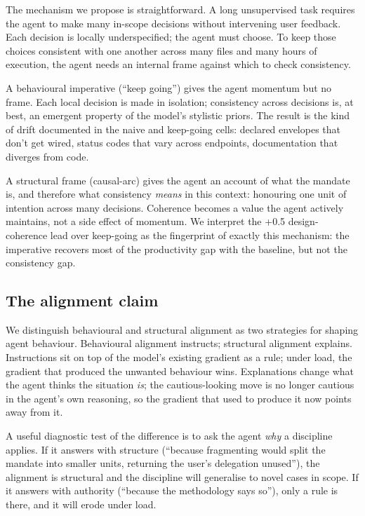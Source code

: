 \documentclass[11pt]{article}
\begin{document}
The mechanism we propose is straightforward. A long unsupervised task
requires the agent to make many in-scope decisions without intervening
user feedback. Each decision is locally underspecified; the agent must
choose. To keep those choices consistent with one another across many
files and many hours of execution, the agent needs an internal frame
against which to check consistency.

A behavioural imperative (``keep going'') gives the agent momentum but no
frame. Each local decision is made in isolation; consistency across
decisions is, at best, an emergent property of the model's stylistic
priors. The result is the kind of drift documented in the naive and
keep-going cells: declared envelopes that don't get wired, status codes
that vary across endpoints, documentation that diverges from code.

A structural frame (causal-arc) gives the agent an account of what the
mandate is, and therefore what consistency \emph{means} in this context:
honouring one unit of intention across many decisions. Coherence becomes a
value the agent actively maintains, not a side effect of momentum. We
interpret the +0.5 design-coherence lead over keep-going as the
fingerprint of exactly this mechanism: the imperative recovers most of
the productivity gap with the baseline, but not the consistency gap.

\subsection{The alignment claim}

We distinguish behavioural and structural alignment as two strategies for
shaping agent behaviour. Behavioural alignment instructs; structural
alignment explains. Instructions sit on top of the model's existing
gradient as a rule; under load, the gradient that produced the
unwanted behaviour wins. Explanations change what the agent thinks the
situation \emph{is}; the cautious-looking move is no longer cautious in
the agent's own reasoning, so the gradient that used to produce it now
points away from it.

A useful diagnostic test of the difference is to ask the agent \emph{why}
a discipline applies. If it answers with structure (``because fragmenting
would split the mandate into smaller units, returning the user's
delegation unused''), the alignment is structural and the discipline will
generalise to novel cases in scope. If it answers with authority
(``because the methodology says so''), only a rule is there, and it will
erode under load.
\end{document}
